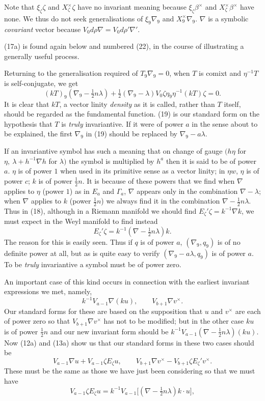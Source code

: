 \documentclass[11pt]{article}
\begin{document}
\indent Note that $\xi_\zeta\zeta$ and $X_\zeta^\times\zeta$ have no invariant meaning because $\xi_\zeta\beta^\times$ and $X_\zeta^\times\beta^\times$ have none. We thus do not seek generalisations of $\xi_9\nabla_9$ and $X_9^\times\nabla_9$. $\nabla$ is a symbolic \emph{covariant} vector because $V_0d\rho\nabla=V_0d\rho'\nabla'$.

\indent (17a) is found again below and numbered (22), in the course of illustrating a generally useful process.

\indent Returning to the generalisation required of $T_9\nabla_9=0$, when $T$ is comixt and $\eta^{-1}T$ is self-conjugate, we get
\begin{equation}(kT)_9(\nabla_9-\tfrac12n\lambda)+\tfrac12(\nabla_9-\lambda)V_0\zeta\eta_9\eta^{-1}(kT)\zeta=0.\tag{19}\end{equation}
It is clear that $kT$, a vector linity \emph{density} as it is called, rather than $T$ itself, should be regarded as the fundamental function. (19) is our standard form on the hypothesis that $T$ is \emph{truly} invariantive. If it were of power $a$ in the sense about to be explained, the first $\nabla_9$ in (19) should be replaced by $\nabla_9-a\lambda$.

\indent If an invariantive symbol has such a meaning that on change of gauge $(h\eta$ for $\eta,\ \lambda+h^{-1}\nabla h$ for $\lambda)$ the symbol is multiplied by $h^a$ then it is said to be of power $a$. $\eta$ is of power $1$ when used in its primitive sense as a vector linity; in $\eta w$, $\eta$ is of power $c$; $k$ is of power $\tfrac12n$. It is because of these powers that we find when $\nabla$ applies to $\eta$ (power $1$) as in $E_a$ and $\Gamma_a$, $\nabla$ appears only in the combination $\nabla-\lambda$; when $\nabla$ applies to $k$ (power $\tfrac12n$) we always find it in the combination $\nabla-\tfrac12n\lambda$. Thus in (18), although in a Riemann manifold we should find $E_\zeta'\zeta=k^{-1}\nabla k$, we must expect in the Weyl manifold to find instead
\[
E_\zeta'\zeta=k^{-1}(\nabla-\tfrac12n\lambda)k.
\]
The reason for this is easily seen. Thus if $q$ is of power $a$, $(\nabla_9,q_9)$ is of no
definite power at all, but as is quite easy to verify $(\nabla_9-a\lambda,q_9)$ is of power $a$.
To be \emph{truly} invariantive a symbol must be of power zero.

\indent An important case of this kind occurs in connection with the earliest invariant expressions we met, namely,
\[
k^{-1}V_{a-1}\nabla(ku),\qquad V_{b+1}\nabla v^\times.
\]
Our standard forms for these are based on the supposition that $u$ and $v^\times$ are each of power zero so that $V_{b+1}\nabla v^\times$ has not to be modified; but in the other case $ku$ is of power $\tfrac12n$ and our new invariant form should be $k^{-1}V_{a-1}(\nabla-\tfrac12n\lambda)(ku)$. Now (12a) and (13a) show us that our standard forms in these two cases should be
\[
V_{a-1}\nabla u+V_{a-1}\zeta E_\zeta u,\qquad V_{b+1}\nabla v^\times-V_{b+1}\zeta E_\zeta'v^\times.
\]
These must be the same as those we have just been considering so that we must have
\begin{equation}V_{a-1}\zeta E_\zeta u=k^{-1}V_{a-1}\bigl[(\nabla-\tfrac12n\lambda)k\mathbin{\cdot}u\bigr],\tag{20}\end{equation}
\end{document}
